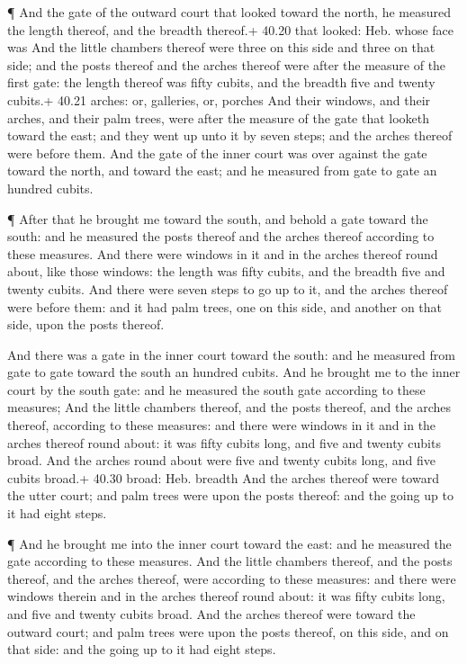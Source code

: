  ¶ And the gate of the outward court that looked toward the
north, he measured the length thereof, and the breadth thereof.+ 40.20
that looked: Heb. whose face was  And the little chambers
thereof were three on this side and three on that side; and the posts
thereof and the arches thereof were after the measure of the first gate:
the length thereof was fifty cubits, and the breadth five and twenty
cubits.+ 40.21 arches: or, galleries, or, porches  And
their windows, and their arches, and their palm trees, were after the
measure of the gate that looketh toward the east; and they went up unto
it by seven steps; and the arches thereof were before them.
 And the gate of the inner court was over against the gate
toward the north, and toward the east; and he measured from gate to gate
an hundred cubits.

 ¶ After that he brought me toward the south, and behold a
gate toward the south: and he measured the posts thereof and the arches
thereof according to these measures.  And there were
windows in it and in the arches thereof round about, like those windows:
the length was fifty cubits, and the breadth five and twenty cubits.
 And there were seven steps to go up to it, and the arches
thereof were before them: and it had palm trees, one on this side, and
another on that side, upon the posts thereof.

 And there was a gate in the inner court toward the south:
and he measured from gate to gate toward the south an hundred cubits.
 And he brought me to the inner court by the south gate:
and he measured the south gate according to these measures;
 And the little chambers thereof, and the posts thereof,
and the arches thereof, according to these measures: and there were
windows in it and in the arches thereof round about: it was fifty cubits
long, and five and twenty cubits broad.  And the arches
round about were five and twenty cubits long, and five cubits broad.+
40.30 broad: Heb. breadth  And the arches thereof were
toward the utter court; and palm trees were upon the posts thereof: and
the going up to it had eight steps.

 ¶ And he brought me into the inner court toward the east:
and he measured the gate according to these measures.  And
the little chambers thereof, and the posts thereof, and the arches
thereof, were according to these measures: and there were windows
therein and in the arches thereof round about: it was fifty cubits long,
and five and twenty cubits broad.  And the arches thereof
were toward the outward court; and palm trees were upon the posts
thereof, on this side, and on that side: and the going up to it had
eight steps.

